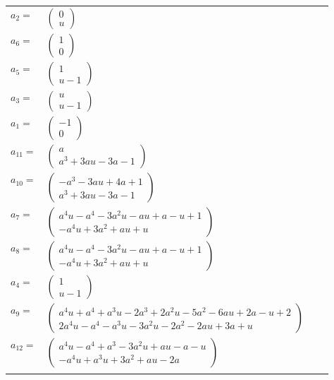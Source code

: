 \documentclass[1p]{elsarticle_modified}
\theoremstyle{definition}
\begin{document}
\begin{tabular}{m{7pt} m{180pt} m{7pt} m{180pt} }
\flushright $a_{2}=$&$\begin{pmatrix}0\\u\end{pmatrix}$ \\
\flushright $a_{6}=$&$\begin{pmatrix}1\\0\end{pmatrix}$ \\
\flushright $a_{5}=$&$\begin{pmatrix}1\\u-1\end{pmatrix}$ \\
\flushright $a_{3}=$&$\begin{pmatrix}u\\u-1\end{pmatrix}$ \\
\flushright $a_{1}=$&$\begin{pmatrix}-1\\0\end{pmatrix}$ \\
\flushright $a_{11}=$&$\begin{pmatrix}a\\a^3+3 a u-3 a-1\end{pmatrix}$ \\
\flushright $a_{10}=$&$\begin{pmatrix}- a^3-3 a u+4 a+1\\a^3+3 a u-3 a-1\end{pmatrix}$ \\
\flushright $a_{7}=$&$\begin{pmatrix}a^4 u- a^4-3 a^2 u- a u+a- u+1\\- a^4 u+3 a^2+a u+u\end{pmatrix}$ \\
\flushright $a_{8}=$&$\begin{pmatrix}a^4 u- a^4-3 a^2 u- a u+a- u+1\\- a^4 u+3 a^2+a u+u\end{pmatrix}$ \\
\flushright $a_{4}=$&$\begin{pmatrix}1\\u-1\end{pmatrix}$ \\
\flushright $a_{9}=$&$\begin{pmatrix}a^4 u+a^4+a^3 u-2 a^3+2 a^2 u-5 a^2-6 a u+2 a- u+2\\2 a^4 u- a^4- a^3 u-3 a^2 u-2 a^2-2 a u+3 a+u\end{pmatrix}$ \\
\flushright $a_{12}=$&$\begin{pmatrix}a^4 u- a^4+a^3-3 a^2 u+a u- a- u\\- a^4 u+a^3 u+3 a^2+a u-2 a\end{pmatrix}$\\&\end{tabular}
\end{document}
